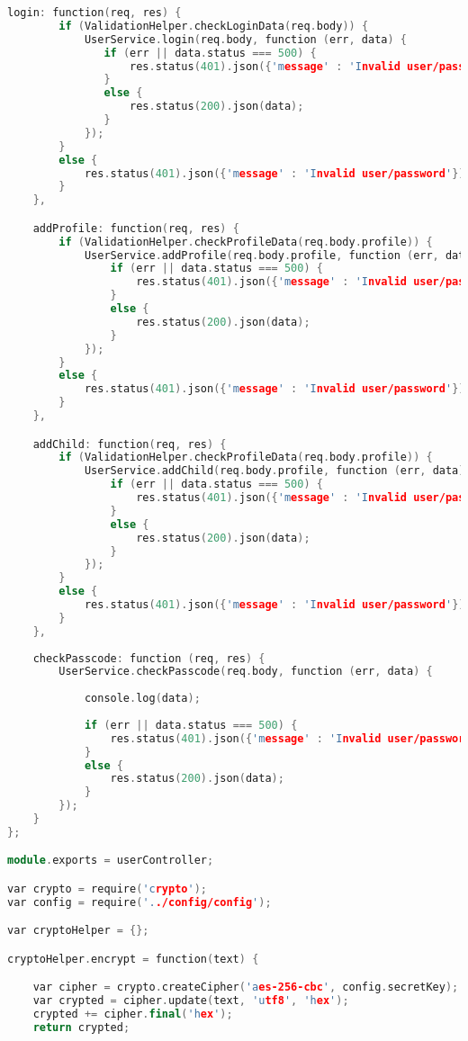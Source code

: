 \begin{lstlisting}[language=C++, style=cplusplusstyle]
    login: function(req, res) {
        if (ValidationHelper.checkLoginData(req.body)) {
            UserService.login(req.body, function (err, data) {
               if (err || data.status === 500) {
                   res.status(401).json({'message' : 'Invalid user/password'});
               }
               else {
                   res.status(200).json(data);
               }
            });
        }
        else {
            res.status(401).json({'message' : 'Invalid user/password'});
        }
    },

    addProfile: function(req, res) {
        if (ValidationHelper.checkProfileData(req.body.profile)) {
            UserService.addProfile(req.body.profile, function (err, data) {
                if (err || data.status === 500) {
                    res.status(401).json({'message' : 'Invalid user/password'});
                }
                else {
                    res.status(200).json(data);
                }
            });
        }
        else {
            res.status(401).json({'message' : 'Invalid user/password'});
        }
    },

    addChild: function(req, res) {
        if (ValidationHelper.checkProfileData(req.body.profile)) {
            UserService.addChild(req.body.profile, function (err, data) {
                if (err || data.status === 500) {
                    res.status(401).json({'message' : 'Invalid user/password'});
                }
                else {
                    res.status(200).json(data);
                }
            });
        }
        else {
            res.status(401).json({'message' : 'Invalid user/password'});
        }
    },
    
    checkPasscode: function (req, res) {
        UserService.checkPasscode(req.body, function (err, data) {
            
            console.log(data);
            
            if (err || data.status === 500) {
                res.status(401).json({'message' : 'Invalid user/password'});
            }
            else {
                res.status(200).json(data);
            }
        });
    }
};

module.exports = userController;

var crypto = require('crypto');
var config = require('../config/config');

var cryptoHelper = {};

cryptoHelper.encrypt = function(text) {

    var cipher = crypto.createCipher('aes-256-cbc', config.secretKey);
    var crypted = cipher.update(text, 'utf8', 'hex');
    crypted += cipher.final('hex');
    return crypted;


\end{lstlisting}
